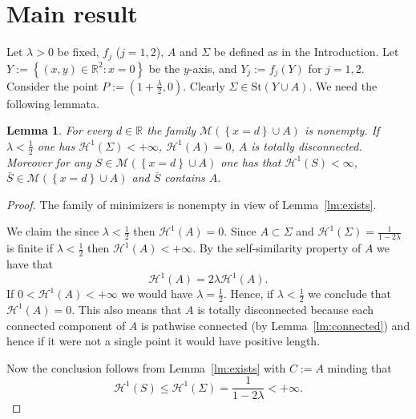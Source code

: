 \documentclass{amsart}
\newcommand{\RR}{\mathbb R}
\renewcommand{\H}{\mathcal H}
\newcommand{\ENCLOSE}[1]{\left\{#1\right\}}
\newcommand{\St}{\mathrm{St}}
\newcommand{\M}{\mathcal{M}}
\renewcommand{\H}{\mathcal{H}}
\newtheorem{lemma}[theorem]{Lemma}
\theoremstyle{definition}
\theoremstyle{remark}
\begin{document}
  \section{Main result}
\label{sec:main}

Let $\lambda>0$ be fixed,
$f_j$ ($j=1,2$), 
$A$ and $\Sigma$ be defined as in the Introduction.
Let $Y:=\ENCLOSE{(x,y)\in\RR^2\colon x=0}$ be the $y$-axis,
and $Y_j := f_j(Y)$ for $j=1,2$.
Consider the point $P:=(1+\frac\lambda 2,0)$.
Clearly $\Sigma\in \St(Y\cup A)$.
We need the following lemmata.

\begin{lemma}\label{lm:existsA} 
  For every $d\in \RR$ the family $\M(\ENCLOSE{x=d}\cup A)$ is nonempty.
  If $\lambda < \frac 1 2$
  one has $\H^1(\Sigma)<+\infty$, $\H^1(A)=0$, $A$ is totally disconnected.
  Moreover for any $S \in \M(\ENCLOSE{x=d}\cup A)$ 
  one has that $\H^1(S)<\infty$,
  $\bar S\in \M(\ENCLOSE{x=d}\cup A)$ and
  $\bar S$ contains $A$.
\end{lemma}
%
\begin{proof}
  The family of minimizers is nonempty in view of Lemma~\ref{lm:exists}.

  We claim the since $\lambda < \frac 1 2$ then $\H^1(A)=0$. 
  Since $A\subset \Sigma$ and $\H^1(\Sigma)=\frac{1}{1-2\lambda}$
  is finite if $\lambda<\frac 1 2$ then $\H^1(A)<+\infty$.
  By the self-similarity property of $A$ we have that 
  \[
  \H^1(A) = 2 \lambda \H^1(A).
  \]
  If $0<\H^1(A)<+\infty$ we would have $\lambda = \frac 1 2$.
  Hence, if $\lambda < \frac 1 2$ we conclude that $\H^1(A)=0$.
  This also means that $A$ is totally disconnected because each connected 
  component of $A$ is pathwise connected (by Lemma~\ref{lm:connected}) 
  and hence if it were not a single point it would have positive length.
    
  Now the conclusion follows from Lemma~\ref{lm:exists} with $C:=A$ 
  minding that 
  \[
    \H^1(S)\le \H^1(\Sigma) = \frac{1}{1-2\lambda}<+\infty.
  \]
\end{proof}
\end{document}
